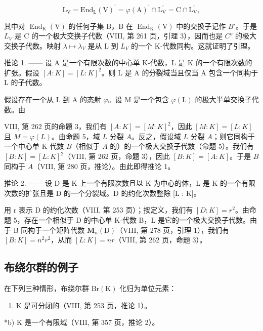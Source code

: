 \[
\mathrm{L} _ {\mathrm{V}} = \mathrm{End} _ {\mathrm{L}} (\mathrm{V}) ^ {\prime} = \varphi (\mathrm{A}) ^ {\prime} \cap \mathrm{L} _ {\mathrm{V}} ^ {\prime} = \mathrm{C} \cap \mathrm{L} _ {\mathrm{V}} ^ {\prime},
\]

其中对 \(\operatorname{End}_{\mathrm{K}}(\mathrm{V})\) 的任何子集 B，B 在 \(\operatorname{End}_{\mathrm{K}}(\mathrm{V})\) 中的交换子记作 \(B'\)。于是 \(L_{V}\) 是 C 的一个极大交换子代数（VIII, 第 261 页，引理 3），因而也是 \(C^{o}\) 的极大交换子代数。映射 \(\lambda \mapsto \lambda_{V}\) 是从 L 到 \(L_{V}\) 的一个 K-代数同构。这就证明了引理。

推论 1. —— 设 A 是一个有限次数的中心单 K-代数，L 是 K 的一个有限次数的扩张。假设 \([A:K]=[L:K]^{2}\)。则 L 是 A 的分裂域当且仅当 A 包含一个同构于 L 的子代数。

假设存在一个从 L 到 A 的态射 \(\varphi\)。设 M 是一个包含 \(\varphi(\mathrm{L})\) 的极大半单交换子代数。由

VIII, 第 262 页的命题 3，我们有 \([A:K] = [M:K]^2\)，因此 \([M:K] = [L:K]\) 且 \(M = \varphi(L)\)。由命题 5，域 \(L\) 分裂 \(A\)。反之，假设域 \(L\) 分裂 \(A\)；则它同构于一个中心单 K-代数 \(B\)（相似于 \(A\) 的）的一个极大交换子代数（命题 5）。我们有 \([B:K] = [L:K]^2\)（VIII, 第 262 页，命题 3），因此 \([B:K] = [A:K]\)。于是 \(B\) 同构于 \(A\)（VIII, 第 280 页，推论）。由此即得推论 1。

推论 2. —— 设 D 是 K 上一个有限次数且以 K 为中心的体，L 是 K 的一个有限次数的扩张且是 D 的一个分裂域。D 的约化次数整除 {[}L : K{]}。

用 r 表示 D 的约化次数（VIII, 第 253 页）；按定义，我们有 \([D:K]=r^{2}\)。由命题 5，存在一个相似于 D 的中心单 K-代数 B，L 是它的一个极大交换子代数。由于 B 同构于一个矩阵代数 \(\mathbf{M}_{n}(\mathrm{D})\)（VIII, 第 278 页，引理 1），我们有 \([B:K]=n^{2}r^{2}\)，从而 \([L:K]=nr\)（VIII, 第 262 页，命题 3）。

\subsection{布绕尔群的例子}

在下列三种情形，布绕尔群 \(\mathrm{Br}(\mathrm{K})\) 化归为单位元素：

\begin{enumerate}
\def\labelenumi{\alph{enumi})}
\tightlist
\item
  K 是可分闭的（VIII, 第 253 页，推论 1）。
\end{enumerate}

*b) K 是一个有限域（VIII, 第 357 页，推论 2）。

